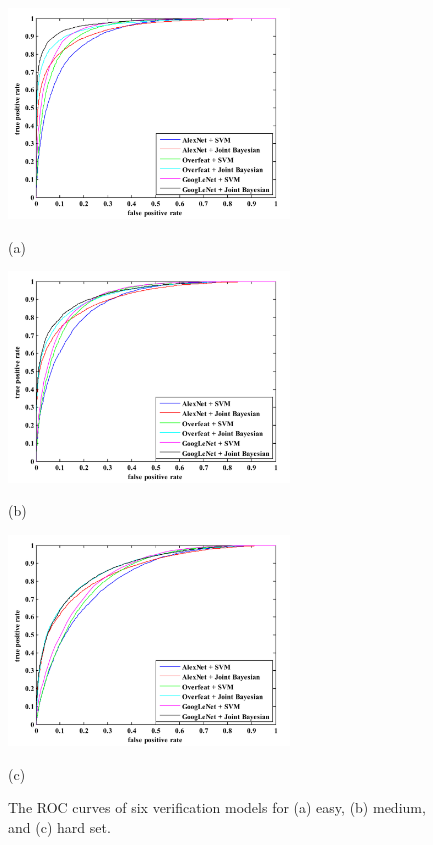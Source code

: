 \documentclass[10pt,twocolumn,letterpaper]{article}
\begin{document}
\begin{figure}[t]
\small\centering
\begin{minipage}[t]{0.9\linewidth}
\centering
\includegraphics[height=2.2in]{roc1.pdf}
\par{(a)}
\end{minipage}
\begin{minipage}[t]{0.9\linewidth}
\centering
\includegraphics[height=2.2in]{roc2.pdf}
\par{(b)}
\end{minipage}
\begin{minipage}[t]{0.9\linewidth}
\centering
\includegraphics[height=2.2in]{roc3.pdf}
\par{(c)}
\end{minipage}
\caption{The ROC curves of six verification models for (a) easy, (b) medium, and (c) hard set. }
\label{fig:roc}
\end{figure}
\end{document}
